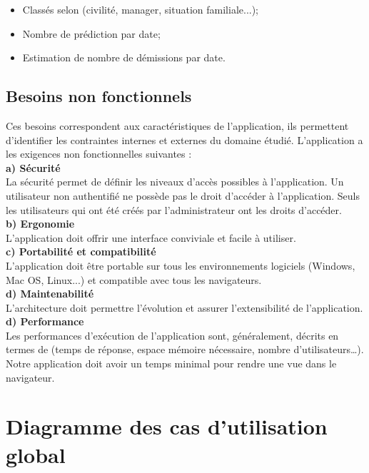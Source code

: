 \begin{itemize}
 \begin{itemize}[label=\textbullet]
        \item Classés selon (civilité, manager, situation familiale...);
        \item Nombre de prédiction par date;
        \item Estimation de nombre de démissions par date.
     \end{itemize}
             \end{itemize}
    \subsection{Besoins non fonctionnels}
Ces besoins correspondent aux caractéristiques de l’application, ils permettent d’identifier les contraintes internes et externes du domaine étudié.
L'application a les exigences non fonctionnelles suivantes :\\
\textbf{a) Sécurité }\\
La sécurité permet de définir les niveaux d’accès possibles à l’application. Un utilisateur non authentifié ne possède pas le droit d’accéder à l’application. Seuls les utilisateurs qui ont été créés par l’administrateur ont les droits d’accéder.\\
\textbf{b)	Ergonomie }\\
L’application doit offrir une interface conviviale et facile à utiliser.\\
\textbf{c) Portabilité et compatibilité }\\
L’application doit être portable sur tous les environnements logiciels (Windows, Mac OS, Linux...) et compatible avec tous les navigateurs.\\
\textbf{d) Maintenabilité }\\
L’architecture doit permettre l’évolution et assurer l’extensibilité de l’application.\\
\textbf{d) Performance }\\
Les performances d’exécution de l’application sont, généralement, décrits en termes de (temps de réponse, espace mémoire nécessaire, nombre d’utilisateurs…).
Notre application doit avoir un temps minimal pour rendre une vue dans le navigateur.

\section{Diagramme des cas d'utilisation global}

